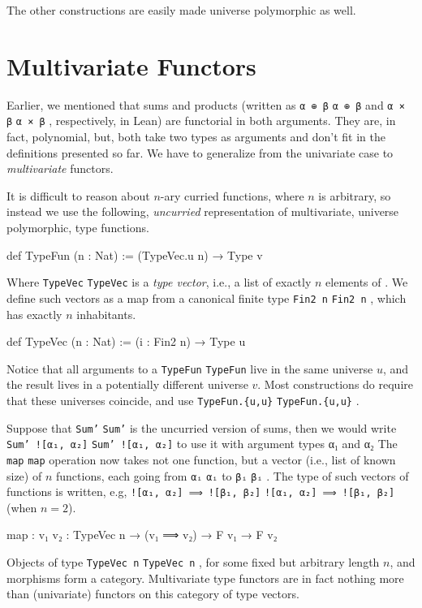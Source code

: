 \documentclass[titlepage]{report}
\newenvironment{remark}{%
\begin{framed}
\begin{trivlist}
    \item[\hskip \labelsep {\bfseries Remark:}]}%
{%
\end{trivlist}%
\end{framed}
}
\newcommand\lean[1]{%
\ifx\leanmode\undefined%
\def\leanmode{1}%
\texttt{\small #1}%
\undef\leanmode%
\else%
\texttt{#1}%
\fi%
}
\newcommand\Typen[1]{\leanm{Type #1}}
\begin{document}
The other constructions are easily made universe polymorphic as well.








\section{Multivariate Functors}
\label{sec:mvfunctor}

Earlier, we mentioned that sums and products (written as \lean{α ⊕ β} and \lean{α × β}, respectively, in Lean) are functorial in both arguments.
They are, in fact, polynomial, but, both take two types as arguments and don't fit in the definitions presented so far. We have to generalize from the univariate case to \emph{multivariate} functors.

It is difficult to reason about $n$-ary curried functions, where $n$ is arbitrary, so instead we use the following, \emph{uncurried} representation of multivariate, universe polymorphic, type functions.

\begin{leancode}
    def TypeFun (n : Nat) := (TypeVec.{u} n) → Type v
\end{leancode}
Where \lean{TypeVec} is a \emph{type vector}, i.e., a list of exactly $n$ elements of \Typen{u}.
We define such vectors as a map from a canonical finite type \lean{Fin2 n}, which has exactly $n$ inhabitants.
\begin{leancode}
    def TypeVec (n : Nat) := (i : Fin2 n) → Type u
\end{leancode}
Notice that all arguments to a \lean{TypeFun} live in the same universe $u$, and the result lives in a potentially different universe $v$. 
Most constructions do require that these universes coincide, and use \lean{TypeFun.\{u,u\}}.

Suppose that \lean{Sum'} is the uncurried version of sums, then we would write \lean{Sum' ![α₁, α₂]} to use it with argument types α₁ and α₂ The \lean{map} operation now takes not one function, but a vector (i.e., list of known size) of $n$ functions, each going from \lean{αᵢ} to \lean{βᵢ}. The type of such vectors of functions is written, e.g, \lean{![α₁, α₂] ⟹ ![β₁, β₂]} (when $n=2$).

\begin{leancode}
    map : {v₁ v₂ : TypeVec n} → (v₁ ⟹ v₂) → F v₁ → F v₂
\end{leancode}
\begin{remark}
    Objects of type \lean{TypeVec n}, for some fixed but arbitrary length $n$, and morphisms  form a category. 
    Multivariate type functors are in fact nothing more than (univariate) functors on this category of type vectors.
\end{remark}
\end{document}
